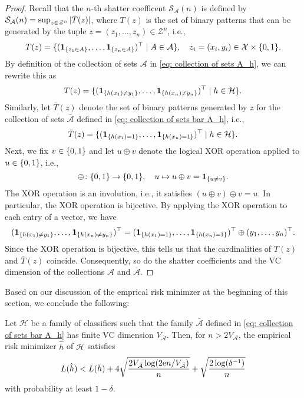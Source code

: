 \begin{proof}
Recall that the $n$-th shatter coefficent $\mathcal{S}_{\mathcal{A}}(n)$ is defined by $\mathcal{S}_{\mathcal{A}}(n) = \sup_{z \in \mathcal{Z}^n} \abs{T(z)}$, where $T(z)$ is the set of binary patterns that can be generated by the tuple $z = (z_1, \dots, z_n) \in \mathcal{Z}^n$, i.e.,
\[
    T(z) = \{(\indSet{z_1 \in A}, \dots, \indSet{z_n \in A})^{\top} \with A \in \mathcal{A}\}, \quad z_i = (x_i, y_i) \in \mathcal{X} \times \set{0, 1}.
\]
By definition of the collection of sets $\mathcal{A}$ in \eqref{eq: collection of sets A_h}, we can rewrite this as
\[
    T(z) = \{(\indSet{h(x_1) \neq y_1}, \dots, \indSet{h(x_n) \neq y_n})^{\top} \with h \in \mathcal{H}\}.
\]
Similarly, let $\bar{T}(z)$ denote the set of binary patterns generated by $z$ for the collection of sets $\bar{\mathcal{A}}$ defined in \eqref{eq: collection of sets bar A_h}, i.e.,
\[
    \bar{T}(z) = \{(\indSet{h(x_1) = 1}, \dots, \indSet{h(x_n) = 1})^{\top} \with h \in \mathcal{H}\}.
\]
Next, we fix $v \in \set{0, 1}$ and let $u \oplus v$ denote the logical XOR operation applied to $u \in \set{0, 1}$, i.e.,
\[
    \oplus \colon \set{0, 1} \to \set{0, 1}, \quad u \mapsto u \oplus v = \indSet{u \neq v}.
\]
The XOR operation is an involution, i.e., it satisfies $(u \oplus v) \oplus v = u$. In particular, the XOR operation is bijective. By applying the XOR operation to each entry of a vector, we have
\[
    (\indSet{h(x_1) \neq y_1}, \dots, \indSet{h(x_n) \neq y_n})^{\top} = (\indSet{h(x_1) = 1}, \dots, \indSet{h(x_n) = 1})^{\top} \oplus (y_1, \dots, y_n)^{\top}.
\]
Since the XOR operation is bijective, this tells us that the cardinalities of $T(z)$ and $\bar{T}(z)$ coincide. Consequently, so do the shatter coefficients and the VC dimension of the collections $\mathcal{A}$ and $\bar{\mathcal{A}}$.
\end{proof}

Based on our discussion of the emprical risk minimzer at the beginning of this section, we conclude the following:

\begin{corollary}
Let $\mathcal{H}$ be a family of classifiers such that the family $\bar{\mathcal{A}}$ defined in \eqref{eq: collection of sets bar A_h} has finite VC dimension $V_{\bar{\mathcal{A}}}$. Then, for $n > 2 V_{\mathcal{A}}$, the empirical risk minimizer $\hat{h}$ of $\mathcal{H}$ satisfies
\[
    L(\hat{h}) < L(\bar{h}) + 4 \sqrt{\frac{2 V_{\bar{\mathcal{A}}} \log(2 \mathrm{e} n / V_{\bar{\mathcal{A}}})}{n}} + \sqrt{\frac{2 \log(\delta^{-1})}{n}}
\]
with probability at least $1 - \delta$.
\end{corollary}
